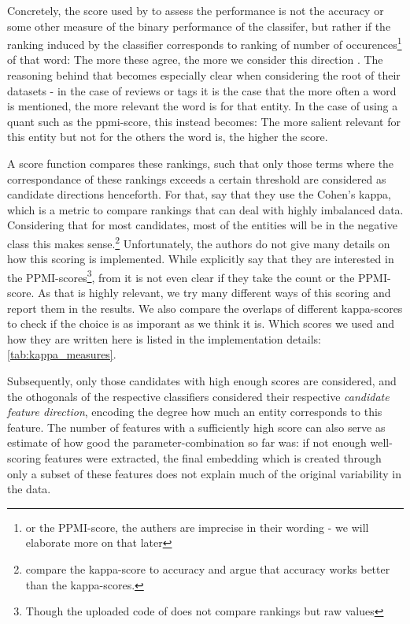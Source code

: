 Concretely, the score used by \cite{Derrac2015} to assess the performance is not the accuracy or some other measure of the binary performance of the classifer, but rather if the ranking induced by the classifier corresponds to ranking of number of occurences\footnote{or the PPMI-score, the authers are imprecise in their wording - we will elaborate more on that later} of that word: The more these agree, the more we consider this direction  \cite[20]{Derrac2015}. The reasoning behind that becomes especially clear when considering the root of their datasets - in the case of reviews or tags it is the case that the more often a word is mentioned, the more relevant the word is for that entity. In the case of using a \gls{quant} such as the \gls{ppmi}-score, this instead becomes: The more salient relevant for this entity but not for the others the word is, the higher the score.

A score function compares these rankings, such that only those terms where the correspondance of these rankings exceeds a certain threshold are considered as candidate directions henceforth. For that, \textcite{Derrac2015} say that they use the Cohen's kappa, which is a metric to compare rankings that can deal with highly imbalanced data. Considering that for most candidates, most of the entities will be in the negative class this makes sense.\footnote{\textcite{Ager2018} compare the kappa-score to accuracy and argue that accuracy works better than the kappa-scores.} Unfortunately, the authors do not give many details on how this scoring is implemented. While \cite{Ager2018,Alshaikh2020} explicitly say that they are interested in the PPMI-scores\footnote{Though the uploaded code of \cite{Alshaikh2020} does not compare rankings but raw values}, from \cite{Derrac2015} it is not even clear if they take the count or the PPMI-score. As that is highly relevant, we try many different ways of this scoring and report them in the results. We also compare the overlaps of different kappa-scores to check if the choice is as imporant as we think it is. Which scores we used and how they are written here is listed in the implementation details: \autoref{tab:kappa_measures}.

Subsequently, only those candidates with high enough scores are considered, and the othogonals of the respective classifiers considered their respective \textit{candidate feature direction}, encoding the degree how much an entity corresponds to this feature. The number of features with a sufficiently high score can also serve as estimate of how good the parameter-combination so far was: if not enough well-scoring features were extracted, the final embedding which is created through only a subset of these features does not explain much of the original variability in the data.


